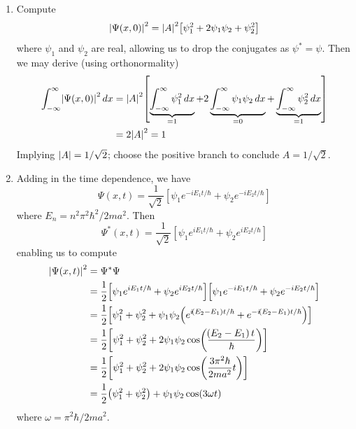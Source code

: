 \documentclass[a4paper]{article}
\begin{document}
\begin{enumerate}[label=(\alph*)]
	\item Compute
	\[
		\abs{\Psi \!\left( x,0 \right)}^{2} = \abs{A}^{2}\!\left[ \psi^{2}_{1} + 2 \psi_{1}\psi_{2} + \psi^{2}_{2} \right]
	\]
	where \( \psi_{1} \) and \( \psi_{2} \) are real, allowing us to drop the conjugates as \( \psi^{*} = \psi \). Then we may derive (using orthonormality)
	\begin{align*}
		\int^{\infty}_{-\infty} \abs{\Psi \!\left( x,0 \right)}^{2} \, dx & = \abs{A}^{2}\!\left[ \underbrace{\int^{\infty}_{-\infty} \psi^{2}_{1} \, dx}_{= 1} + 2 \underbrace{\int^{\infty}_{-\infty} \psi_{1}\psi_{2} \, dx}_{= 0} + \underbrace{\int^{\infty}_{-\infty} \psi^{2}_{2} \, dx}_{= 1} \right] \\
		 & = 2\abs{A}^{2} = 1
	\end{align*}
	Implying \( \abs{A} = 1 / \sqrt{2} \); choose the positive branch to conclude \( A = 1 / \sqrt{2} \).
	\item Adding in the time dependence, we have
	\[
		\Psi \!\left( x,t \right) = \frac{1}{\sqrt{2}}\!\left[ \psi_{1}e^{-iE_{1}t / \hbar} + \psi_{2}e^{-iE_{2}t / \hbar} \right] 
	\]
	where \( E_{n} = n^{2}\pi^{2}\hbar^{2} / 2ma^{2} \). Then
	\[
		\Psi^{*}\!\left( x,t \right) = \frac{1}{\sqrt{2}}\!\left[ \psi_{1}e^{iE_{1}t / \hbar} + \psi_{2}e^{iE_{2}t / \hbar} \right]
	\]
	enabling us to compute
	\begin{align*}
		\abs{\Psi \!\left( x,t \right)}^{2} & = \Psi^{*}\Psi \\
						    & = \frac{1}{2}\!\left[ \psi_{1}e^{iE_{1}t / \hbar} + \psi_{2}e^{iE_{2}t / \hbar} \right]\!\left[ \psi_{1}e^{-iE_{1}t / \hbar} + \psi_{2}e^{-iE_{2}t / \hbar} \right] \\ 
						    & = \frac{1}{2}\!\left[ \psi^{2}_{1} + \psi^{2}_{2} + \psi_{1}\psi_{2}\!\left( e^{i \!\left( E_{2} - E_{1} \right)t / \hbar} + e^{-i \!\left( E_{2} - E_{1} \right)t / \hbar} \right) \right] \\
						    & = \frac{1}{2}\!\left[ \psi^{2}_{1} + \psi^{2}_{2} + 2\psi_{1}\psi_{2}\cos\!\left(\frac{\!\left( E_{2} - E_{1} \right)t}{\hbar}\right) \right] \\
						    & = \frac{1}{2}\!\left[ \psi^{2}_{1} + \psi^{2}_{2} + 2 \psi_{1}\psi_{2}\cos\!\left(\frac{3 \pi^{2}\hbar}{2ma^{2}}t\right) \right] \\
						    & = \frac{1}{2}\!\left( \psi^{2}_{1} + \psi^{2}_{2} \right) + \psi_{1}\psi_{2}\cos\!\left(3 \omega t\right)
	\end{align*}
	where \( \omega = \pi^{2}\hbar / 2ma^{2} \).

\end{enumerate}
\end{document}
